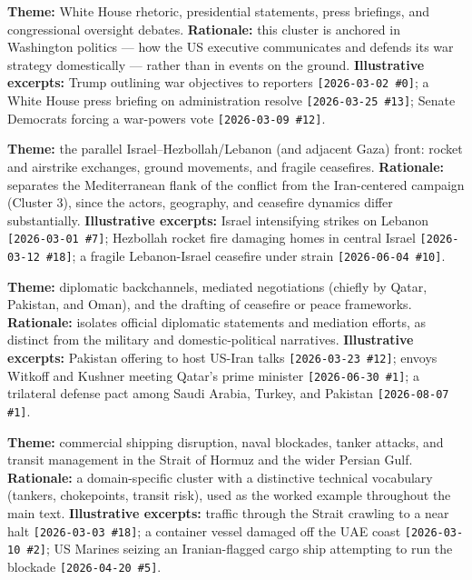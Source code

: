 \documentclass[11pt]{article}
\begin{document}
\begin{description}[leftmargin=0pt, style=nextline, itemsep=8pt]
\item[Cluster 4 --- US Domestic Politics \& Presidential Leadership ($n=306$)]
\textbf{Theme:} White House rhetoric, presidential statements, press
briefings, and congressional oversight debates. \textbf{Rationale:} this
cluster is anchored in Washington politics --- how the US executive
communicates and defends its war strategy domestically --- rather than in
events on the ground. \textbf{Illustrative excerpts:} Trump outlining war
objectives to reporters \texttt{[2026-03-02 \#0]}; a White House press
briefing on administration resolve \texttt{[2026-03-25 \#13]}; Senate
Democrats forcing a war-powers vote \texttt{[2026-03-09 \#12]}.

\item[Cluster 5 --- Israel-Hezbollah-Lebanon Theater ($n=170$)]
\textbf{Theme:} the parallel Israel--Hezbollah/Lebanon (and adjacent Gaza)
front: rocket and airstrike exchanges, ground movements, and fragile
ceasefires. \textbf{Rationale:} separates the Mediterranean flank of the
conflict from the Iran-centered campaign (Cluster 3), since the actors,
geography, and ceasefire dynamics differ substantially.
\textbf{Illustrative excerpts:} Israel intensifying strikes on Lebanon
\texttt{[2026-03-01 \#7]}; Hezbollah rocket fire damaging homes in central
Israel \texttt{[2026-03-12 \#18]}; a fragile Lebanon-Israel ceasefire under
strain \texttt{[2026-06-04 \#10]}.

\item[Cluster 6 --- Diplomacy \& International Mediation ($n=235$)]
\textbf{Theme:} diplomatic backchannels, mediated negotiations (chiefly by
Qatar, Pakistan, and Oman), and the drafting of ceasefire or peace
frameworks. \textbf{Rationale:} isolates official diplomatic statements and
mediation efforts, as distinct from the military and domestic-political
narratives. \textbf{Illustrative excerpts:} Pakistan offering to host
US-Iran talks \texttt{[2026-03-23 \#12]}; envoys Witkoff and Kushner meeting
Qatar's prime minister \texttt{[2026-06-30 \#1]}; a trilateral defense pact
among Saudi Arabia, Turkey, and Pakistan \texttt{[2026-08-07 \#1]}.

\item[Cluster 7 --- Maritime Conflict \& Strait of Hormuz ($n=215$)]
\textbf{Theme:} commercial shipping disruption, naval blockades, tanker
attacks, and transit management in the Strait of Hormuz and the wider
Persian Gulf. \textbf{Rationale:} a domain-specific cluster with a
distinctive technical vocabulary (tankers, chokepoints, transit risk),
used as the worked example throughout the main text.
\textbf{Illustrative excerpts:} traffic through the Strait crawling to a
near halt \texttt{[2026-03-03 \#18]}; a container vessel damaged off the
UAE coast \texttt{[2026-03-10 \#2]}; US Marines seizing an Iranian-flagged
cargo ship attempting to run the blockade \texttt{[2026-04-20 \#5]}.

\end{description}
\end{document}
